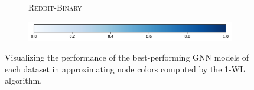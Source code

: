 \begin{figure}
\begin{subfigure}[b]{0.49\textwidth}
		\vspace*{-5ex}
        \caption{\textsc{Reddit-Binary}}
	\end{subfigure}
	\par\bigskip
	\begin{subfigure}[b]{0.6\textwidth}
		\centering
		\includegraphics[width=\textwidth]{Figures/colorbar.pdf}
	\end{subfigure}
	\caption{Visualizing the performance of the best-performing GNN models of each dataset in approximating node colors computed by the 1-WL algorithm.}
\end{figure}


